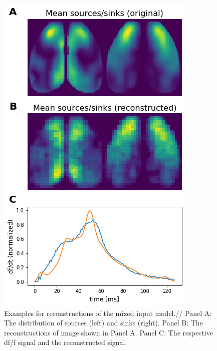\begin{figure}[!htb]
\centering
\includegraphics[width=\textwidth,height=\textheight,keepaspectratio]{Figures/reconstructions_example_mixed_input}
\decoRule
\caption[Examples for reconstructions of the mixed input model]{Examples for reconstructions of the mixed input model.// Panel A: The distribution of sources (left) and sinks (right). Panel B: The reconstructions of image shown in Panel A. Panel C: The respective df/f signal and the reconstructed signal.}
\label{fig:reconstructions_example_mixed_input}
\end{figure}

